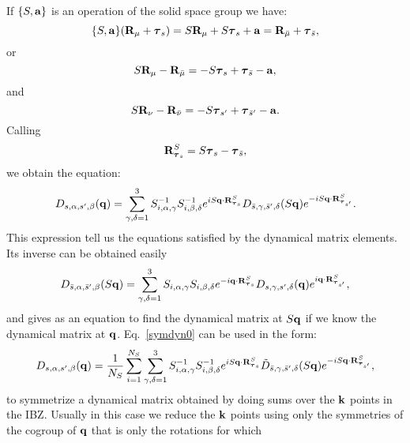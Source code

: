 \documentclass[12pt,a4paper,twoside]{report}
\begin{document}
If $\{S,{\bf a}\}$ is an operation of the solid space group we have:
\begin{equation}
\{S,{\bf a}\} ({\bf R}_\mu + \boldsymbol{\tau}_{s}) = 
S {\bf R}_\mu + S \boldsymbol{\tau}_{s} +{\bf a}=
{\bf R}_{\bar \mu} + \boldsymbol{\tau}_{\bar s},
\end{equation}
or
\begin{equation}
S {\bf R}_\mu -  {\bf R}_{\bar \mu} = - S \boldsymbol{\tau}_s + \boldsymbol{\tau}_{\bar s} - {\bf a},
\end{equation}
and
\begin{equation}
S {\bf R}_\nu -  {\bf R}_{\bar \nu} = - S \boldsymbol{\tau}_{s'} + \boldsymbol{\tau}_{\bar s'} - {\bf a}.
\end{equation}
Calling
\begin{equation}
{\bf R}^{S}_{\boldsymbol{\tau}_s} = S \boldsymbol{\tau}_{s} - \boldsymbol{\tau}_{\bar s},
\label{rstaus}
\end{equation}
we obtain the equation:
\begin{equation}
D_{s,\alpha,s',\beta}({\bf q}) =
\sum_{\gamma,\delta=1}^3  S^{-1}_{i,\alpha,\gamma} S^{-1}_{i,\beta,\delta}
e^{i S {\bf q} \cdot {\bf R}^{S}_{\boldsymbol{\tau}_s} }
D_{\bar s,\gamma,\bar s',\delta}(S{\bf q})
e^{-i S{\bf q} \cdot {\bf R}^{S}_{\boldsymbol{\tau}_{s'}}}.
\label{symdyn0}
\end{equation}
This expression tell us the equations satisfied by the dynamical matrix elements.
Its inverse can be obtained easily
\begin{equation}
D_{\bar s,\alpha,\bar s',\beta}(S{\bf q}) =
\sum_{\gamma,\delta=1}^3  S_{i,\alpha,\gamma} S_{i,\beta,\delta}
e^{-i {\bf q} \cdot {\bf R}^{S}_{\boldsymbol{\tau}_s} }
D_{s,\gamma,s',\delta}({\bf q})
e^{i {\bf q} \cdot {\bf R}^{S}_{\boldsymbol{\tau}_{s'}}},
\label{dynmat_inv}
\end{equation}
and gives as an equation to find the dynamical matrix at $S{\bf q}$ if we know the dynamical matrix at
${\bf q}$.
Eq.~\ref{symdyn0} can be used in the form:
\begin{equation}
D_{s,\alpha,s',\beta}({\bf q}) ={1\over N_S}
\sum_{i=1}^{N_S}
\sum_{\gamma,\delta=1}^3  S^{-1}_{i,\alpha,\gamma} S^{-1}_{i,\beta,\delta}
e^{i S {\bf q} \cdot {\bf R}^{S}_{\boldsymbol{\tau}_s} }
\tilde D_{\bar s,\gamma,\bar s',\delta}(S{\bf q})
e^{-i S{\bf q} \cdot {\bf R}^{S}_{\boldsymbol{\tau}_{s'}}},
\label{symdyn1}
\end{equation}
to symmetrize a dynamical matrix obtained by doing sums over the ${\bf k}$ points in the IBZ. Usually in this case we reduce the ${\bf k}$ points using only the symmetries of the cogroup of ${\bf q}$ that is only the rotations for which
\end{document}

